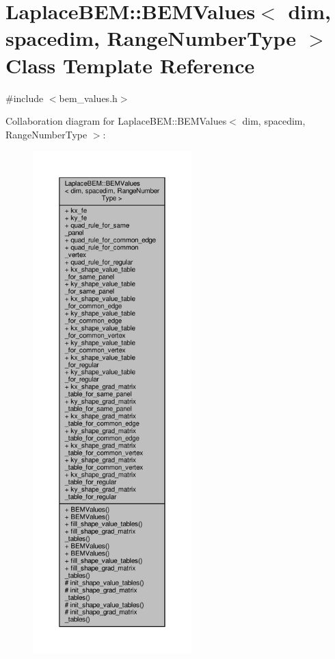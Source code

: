 \hypertarget{classLaplaceBEM_1_1BEMValues}{}\section{Laplace\+B\+EM\+:\+:B\+E\+M\+Values$<$ dim, spacedim, Range\+Number\+Type $>$ Class Template Reference}
\label{classLaplaceBEM_1_1BEMValues}


{\ttfamily \#include $<$bem\+\_\+values.\+h$>$}



Collaboration diagram for Laplace\+B\+EM\+:\+:B\+E\+M\+Values$<$ dim, spacedim, Range\+Number\+Type $>$\+:\nopagebreak
\begin{figure}[H]
\begin{center}
\leavevmode
\includegraphics[height=550pt]{classLaplaceBEM_1_1BEMValues__coll__graph}
\end{center}
\end{figure}
